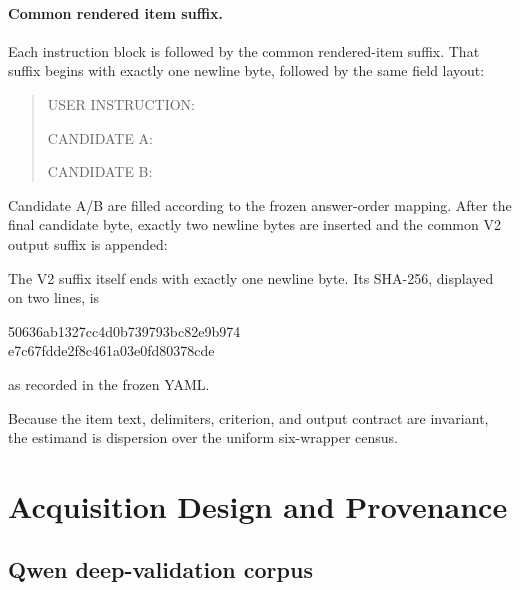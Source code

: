 \documentclass[letterpaper]{article}
\newcommand{\1}{\mathbf 1}
\begin{document}
\paragraph{Common rendered item suffix.}
Each instruction block is followed by the common rendered-item suffix. That
suffix begins with exactly one newline byte, followed by the same field layout:
\begin{quote}\small\ttfamily
USER INSTRUCTION:\par
{}\par\medskip
CANDIDATE A:\par
{}\par\medskip
CANDIDATE B:\par
{}
\end{quote}
Candidate A/B are filled according to the frozen answer-order mapping. After
the final candidate byte, exactly two newline bytes are inserted and the
common V2 output suffix is appended:
\begin{quote}\small\ttfamily
{}\par\medskip
{}
\end{quote}
The V2 suffix itself ends with exactly one newline byte. Its SHA-256, displayed on two
lines, is
\begin{center}\ttfamily\small
50636ab1327cc4d0b739793bc82e9b974\\
e7c67fdde2f8c461a03e0fd80378cde
\end{center}
as recorded in the frozen YAML.

Because the item text, delimiters, criterion, and output contract are
invariant, the estimand is dispersion over the uniform six-wrapper census.

\section{Acquisition Design and Provenance}

\subsection{Qwen deep-validation corpus}
\end{document}
